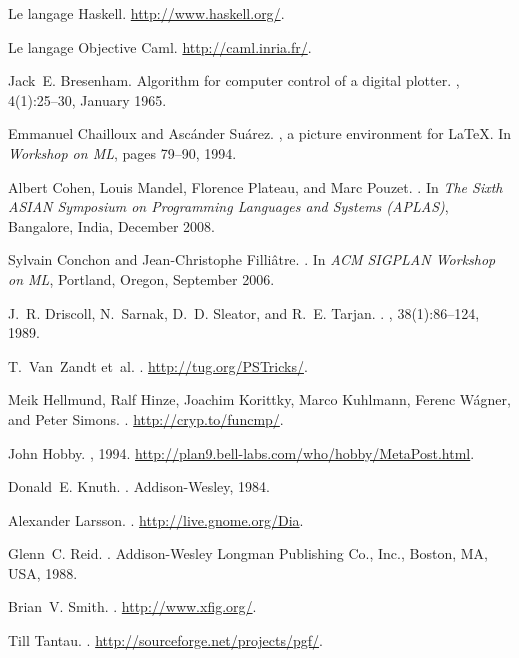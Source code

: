 \documentclass[twoside]{studia-Hermann}
\newcommand{\metapost}{\MP}
\newcommand{\fmpost}{\textit{functional} \metapost}
\newcommand{\metafont}{\MF}
\newcommand{\mlpictex}{mlP\hspace{-0.2em}\raisebox{-0.2em}{i}\hspace{-0.1em}c\hspace{-0.1em}\TeX}
\begin{document}
\begin{thebibliography}{10}

{Le langage Haskell}.
\newblock \url{http://www.haskell.org/}.

{Le langage Objective Caml}.
\newblock \url{http://caml.inria.fr/}.

Jack~E. Bresenham.
\newblock Algorithm for computer control of a digital plotter.
, 4(1):25--30, January 1965.

Emmanuel Chailloux and Asc\'ander Su\'arez.
\newblock {\mlpictex}, a picture environment for {\LaTeX}.
\newblock In {\em Workshop on {ML}}, pages 79--90, 1994.

Albert Cohen, Louis Mandel, Florence Plateau, and Marc Pouzet.
.
\newblock In {\em The Sixth ASIAN Symposium on Programming Languages and
  Systems (APLAS)}, Bangalore, India, December 2008.

Sylvain Conchon and Jean-Christophe Filli\^atre.
.
\newblock In {\em ACM SIGPLAN Workshop on ML}, Portland, Oregon, September
  2006.

J.~R. Driscoll, N.~Sarnak, D.~D. Sleator, and R.~E. Tarjan.
.
, 38(1):86--124, 1989.

T.~Van~Zandt et~al.
.
\newblock \url{http://tug.org/PSTricks/}.

Meik Hellmund, Ralf Hinze, Joachim Korittky, Marco Kuhlmann, Ferenc W\'agner,
  and Peter Simons.
\newblock {\fmpost}.
\newblock \url{http://cryp.to/funcmp/}.

John Hobby.
\newblock \metapost, 1994.
\newblock \url{http://plan9.bell-labs.com/who/hobby/MetaPost.html}.

Donald~E. Knuth.
\newblock {\em The {\metafont} Book}.
\newblock Addison-Wesley, 1984.

Alexander Larsson.
.
\newblock \url{http://live.gnome.org/Dia}.

Glenn~C. Reid.
.
\newblock Addison-Wesley Longman Publishing Co., Inc., Boston, MA, USA, 1988.

Brian~V. Smith.
.
\newblock \url{http://www.xfig.org/}.

Till Tantau.
.
\newblock \url{http://sourceforge.net/projects/pgf/}.

\end{thebibliography}
%
%

\vfill

\end{document}
